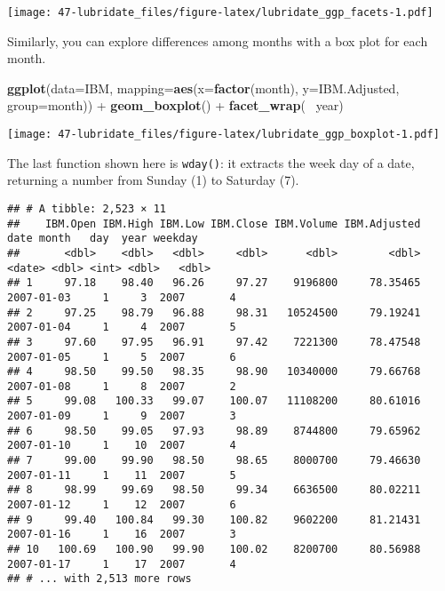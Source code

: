 \documentclass[]{book}
\newenvironment{Shaded}{\begin{snugshade}}{\end{snugshade}}
\newcommand{\KeywordTok}[1]{\textcolor[rgb]{0.13,0.29,0.53}{\textbf{{#1}}}}
\newcommand{\DataTypeTok}[1]{\textcolor[rgb]{0.13,0.29,0.53}{{#1}}}
\newcommand{\StringTok}[1]{\textcolor[rgb]{0.31,0.60,0.02}{{#1}}}
\newcommand{\NormalTok}[1]{{#1}}
\begin{document}
\texttt{[image: 47-lubridate\_files/figure-latex/lubridate\_ggp\_facets-1.pdf]}

Similarly, you can explore differences among months with a box plot for
each month.

\begin{Shaded}
\begin{Highlighting}[]
\KeywordTok{ggplot}\NormalTok{(}\DataTypeTok{data=}\NormalTok{IBM, }\DataTypeTok{mapping=}\KeywordTok{aes}\NormalTok{(}\DataTypeTok{x=}\KeywordTok{factor}\NormalTok{(month), }\DataTypeTok{y=}\NormalTok{IBM.Adjusted, }\DataTypeTok{group=}\NormalTok{month)) +}
\StringTok{  }\KeywordTok{geom_boxplot}\NormalTok{() +}
\StringTok{  }\KeywordTok{facet_wrap}\NormalTok{(~}\StringTok{ }\NormalTok{year)}
\end{Highlighting}
\end{Shaded}

\texttt{[image: 47-lubridate\_files/figure-latex/lubridate\_ggp\_boxplot-1.pdf]}

The last function shown here is \texttt{wday()}: it extracts the week
day of a date, returning a number from Sunday (1) to Saturday (7).

\begin{Shaded}
\end{Shaded}

\begin{verbatim}
## # A tibble: 2,523 × 11
##    IBM.Open IBM.High IBM.Low IBM.Close IBM.Volume IBM.Adjusted       date month   day  year weekday
##       <dbl>    <dbl>   <dbl>     <dbl>      <dbl>        <dbl>     <date> <dbl> <int> <dbl>   <dbl>
## 1     97.18    98.40   96.26     97.27    9196800     78.35465 2007-01-03     1     3  2007       4
## 2     97.25    98.79   96.88     98.31   10524500     79.19241 2007-01-04     1     4  2007       5
## 3     97.60    97.95   96.91     97.42    7221300     78.47548 2007-01-05     1     5  2007       6
## 4     98.50    99.50   98.35     98.90   10340000     79.66768 2007-01-08     1     8  2007       2
## 5     99.08   100.33   99.07    100.07   11108200     80.61016 2007-01-09     1     9  2007       3
## 6     98.50    99.05   97.93     98.89    8744800     79.65962 2007-01-10     1    10  2007       4
## 7     99.00    99.90   98.50     98.65    8000700     79.46630 2007-01-11     1    11  2007       5
## 8     98.99    99.69   98.50     99.34    6636500     80.02211 2007-01-12     1    12  2007       6
## 9     99.40   100.84   99.30    100.82    9602200     81.21431 2007-01-16     1    16  2007       3
## 10   100.69   100.90   99.90    100.02    8200700     80.56988 2007-01-17     1    17  2007       4
## # ... with 2,513 more rows
\end{verbatim}
\end{document}
